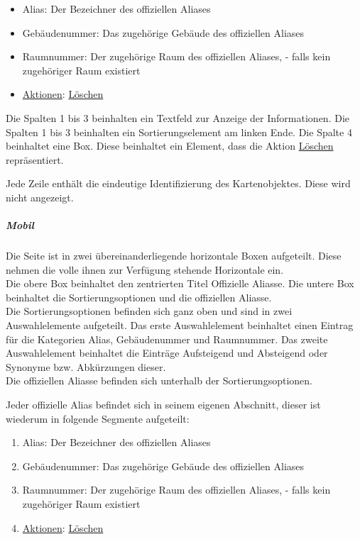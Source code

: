 \begin{itemize}
    \item Alias: Der Bezeichner des offiziellen Aliases
    \item Gebäudenummer: Das zugehörige Gebäude des offiziellen Aliases
    \item Raumnummer: Der zugehörige Raum des offiziellen Aliases, \dq - \dq{} falls kein zugehöriger Raum existiert
    \item \hyperref[AP_Aktionen_Offizielle_Aliasse]{Aktionen}: \hyperref[AP_Aktionen_Offizielle_Aliasse_Loschen]{Löschen}
\end{itemize}

Die Spalten 1 bis 3 beinhalten ein Textfeld zur Anzeige der Informationen.
Die Spalten 1 bis 3 beinhalten ein Sortierungselement am linken Ende.
Die Spalte 4 beinhaltet eine Box. Diese beinhaltet ein Element, dass die Aktion \hyperref[AP_Aktionen_Offizielle_Aliasse_Loschen]{Löschen} repräsentiert.

Jede Zeile enthält die eindeutige Identifizierung des Kartenobjektes. Diese wird nicht angezeigt.

\subparagraph*{Mobil}
Die Seite ist in zwei übereinanderliegende horizontale Boxen aufgeteilt. Diese nehmen die volle ihnen zur Verfügung stehende Horizontale ein. \\
Die obere Box beinhaltet den zentrierten Titel \dq Offizielle Aliasse\dq.
Die untere Box beinhaltet die Sortierungsoptionen und die offiziellen Aliasse. \\
Die Sortierungsoptionen befinden sich ganz oben und sind in zwei Auswahlelemente aufgeteilt. 
Das erste Auswahlelement beinhaltet einen Eintrag für die Kategorien Alias, Gebäudenummer und Raumnummer.
Das zweite Auswahlelement beinhaltet die Einträge \dq Aufsteigend \dq{} und \dq Absteigend \dq{} oder Synonyme bzw. Abkürzungen dieser. \\
Die offiziellen Aliasse befinden sich unterhalb der Sortierungsoptionen.

Jeder offizielle Alias befindet sich in seinem eigenen Abschnitt, dieser ist wiederum in folgende Segmente aufgeteilt:

\begin{enumerate}
    \item Alias: Der Bezeichner des offiziellen Aliases
    \item Gebäudenummer: Das zugehörige Gebäude des offiziellen Aliases
    \item Raumnummer: Der zugehörige Raum des offiziellen Aliases, \dq - \dq{} falls kein zugehöriger Raum existiert
    \item \hyperref[AP_Aktionen_Offizielle_Aliasse]{Aktionen}: \hyperref[AP_Aktionen_Offizielle_Aliasse_Loschen]{Löschen}
\end{enumerate}

